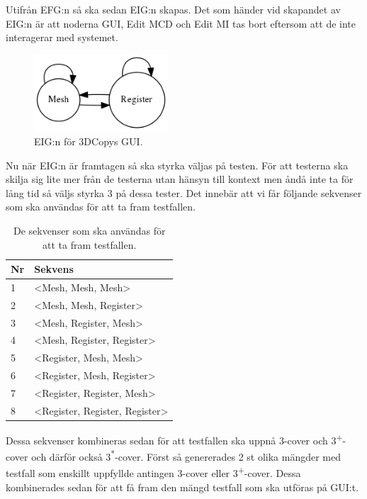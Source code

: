 Utifrån EFG:n så ska sedan EIG:n skapas. Det som händer vid skapandet av EIG:n är att noderna GUI, Edit MCD och Edit MI tas bort eftersom att de inte interagerar med systemet.

\begin{figure}[H]
	\centering
	\includegraphics[width=50mm]{figures/3DCopyGUIEIG.png}
	\caption{EIG:n för 3DCopys GUI.}
	\label{fig:3dcopy_guieig}
\end{figure}

Nu när EIG:n är framtagen så ska styrka väljas på testen. För att testerna ska skilja sig lite mer från de testerna utan hänsyn till kontext men åndå inte ta för lång tid så väljs styrka 3 på dessa tester. Det innebär att vi får följande sekvenser som ska användas för att ta fram testfallen.

\begin{table}[h]
	\caption{De sekvenser som ska användas för att ta fram testfallen.}
	\centering
\begin{tabular}{|l|l|}
	\hline
	\textbf{Nr} & \textbf{Sekvens} \\
	\hline
	1 & <Mesh, Mesh, Mesh> \\
	\hline
	2 & <Mesh, Mesh, Register> \\
	\hline
	3 & <Mesh, Register, Mesh> \\
	\hline
	4 & <Mesh, Register, Register> \\
	\hline
	5 & <Register, Mesh, Mesh> \\
	\hline
	6 & <Register, Mesh, Register> \\
	\hline
	7 & <Register, Register, Mesh> \\
	\hline
	8 & <Register, Register, Register> \\
	\hline
\end{tabular}
\end{table}

Dessa sekvenser kombineras sedan för att testfallen ska uppnå 3-cover och 3\textsuperscript{+}-cover och därför också 3\textsuperscript{*}-cover. Först så genererades 2 st olika  mängder med testfall som enskillt uppfyllde antingen 3-cover eller 3\textsuperscript{+}-cover. Dessa kombinerades sedan för att få fram den mängd testfall som ska utföras på GUI:t.


